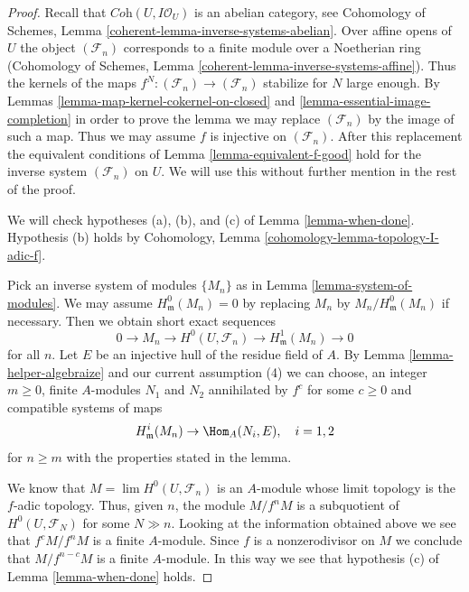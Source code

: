 \begin{proof}
Recall that $\textit{Coh}(U, I\mathcal{O}_U)$ is an abelian category, see
Cohomology of Schemes, Lemma \ref{coherent-lemma-inverse-systems-abelian}.
Over affine opens of $U$ the object $(\mathcal{F}_n)$
corresponds to a finite module over a Noetherian ring
(Cohomology of Schemes, Lemma \ref{coherent-lemma-inverse-systems-affine}).
Thus the kernels of the maps $f^N : (\mathcal{F}_n) \to (\mathcal{F}_n)$
stabilize for $N$ large enough. By
Lemmas \ref{lemma-map-kernel-cokernel-on-closed} and
\ref{lemma-essential-image-completion}
in order to prove the lemma
we may replace $(\mathcal{F}_n)$ by the image of such a map.
Thus we may assume $f$ is injective on $(\mathcal{F}_n)$.
After this replacement the equivalent conditions of
Lemma \ref{lemma-equivalent-f-good} hold for the inverse system
$(\mathcal{F}_n)$ on $U$. We will use this without further mention
in the rest of the proof.

\medskip\noindent
We will check hypotheses (a), (b), and (c) of
Lemma \ref{lemma-when-done}. Hypothesis (b) holds by
Cohomology, Lemma \ref{cohomology-lemma-topology-I-adic-f}.

\medskip\noindent
Pick an inverse system of modules $\{M_n\}$ as in
Lemma \ref{lemma-system-of-modules}.
We may assume $H^0_\mathfrak m(M_n) = 0$ by replacing $M_n$ by
$M_n/H^0_\mathfrak m(M_n)$ if necessary. Then we obtain short exact
sequences
$$
0 \to M_n \to H^0(U, \mathcal{F}_n) \to H^1_\mathfrak m(M_n) \to 0
$$
for all $n$. Let $E$ be an injective hull of the residue field of $A$.
By Lemma \ref{lemma-helper-algebraize} and our current assumption (4)
we can choose, an integer $m \geq 0$, finite $A$-modules
$N_1$ and $N_2$ annihilated by $f^c$ for some $c \geq 0$ and
compatible systems of maps
$$
H^i_\mathfrak m(M_n) \to \Hom_A(N_i, E), \quad i = 1, 2
$$
for $n \geq m$
with the properties stated in the lemma.

\medskip\noindent
We know that $M = \lim H^0(U, \mathcal{F}_n)$ is an $A$-module whose
limit topology is the $f$-adic topology. Thus, given $n$, the module
$M/f^nM$ is a subquotient of $H^0(U, \mathcal{F}_N)$ for some $N \gg n$.
Looking at the information obtained above we see that
$f^cM/f^nM$ is a finite $A$-module. Since $f$ is a nonzerodivisor
on $M$ we conclude that $M/f^{n - c}M$ is a finite $A$-module.
In this way we see that hypothesis (c) of Lemma \ref{lemma-when-done} holds.


\end{proof}
